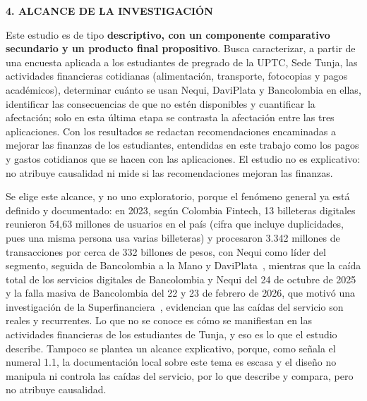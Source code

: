 \hypertarget{sec:alcance}{}%
\begin{center}
    {\Large\bfseries 4. ALCANCE DE LA INVESTIGACIÓN}
\end{center}
\vspace{1em}

\noindent Este estudio es de tipo \textbf{descriptivo, con un componente comparativo secundario y un producto final propositivo}. Busca caracterizar, a partir de una encuesta aplicada a los estudiantes de pregrado de la UPTC, Sede Tunja, las actividades financieras cotidianas (alimentación, transporte, fotocopias y pagos académicos), determinar cuánto se usan Nequi, DaviPlata y Bancolombia en ellas, identificar las consecuencias de que no estén disponibles y cuantificar la afectación; solo en esta última etapa se contrasta la afectación entre las tres aplicaciones. Con los resultados se redactan recomendaciones encaminadas a mejorar las finanzas de los estudiantes, entendidas en este trabajo como los pagos y gastos cotidianos que se hacen con las aplicaciones. El estudio no es explicativo: no atribuye causalidad ni mide si las recomendaciones mejoran las finanzas.
\par\vspace{1.2em}

\noindent Se elige este alcance, y no uno exploratorio, porque el fenómeno general ya está definido y documentado: en 2023, según Colombia Fintech, 13 billeteras digitales reunieron 54,63 millones de usuarios en el país (cifra que incluye duplicidades, pues una misma persona usa varias billeteras) y procesaron 3.342 millones de transacciones por cerca de 332 billones de pesos, con Nequi como líder del segmento, seguida de Bancolombia a la Mano y DaviPlata~\cite{colfintech2024}, mientras que la caída total de los servicios digitales de Bancolombia y Nequi del 24 de octubre de 2025~\cite{elcolombiano2025} y la falla masiva de Bancolombia del 22 y 23 de febrero de 2026, que motivó una investigación de la Superfinanciera~\cite{infobae2026}, evidencian que las caídas del servicio son reales y recurrentes. Lo que no se conoce es cómo se manifiestan en las actividades financieras de los estudiantes de Tunja, y eso es lo que el estudio describe. Tampoco se plantea un alcance explicativo, porque, como señala el numeral 1.1, la documentación local sobre este tema es escasa y el diseño no manipula ni controla las caídas del servicio, por lo que describe y compara, pero no atribuye causalidad.
\par\vspace{1.2em}

